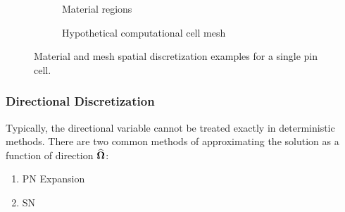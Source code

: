 {{{{                \begin{figure}[h]
                    \centering
                    \begin{subfigure}[t]{0.45\linewidth}
                        \centering
                        \def\svgwidth{\linewidth}
                        
                        \caption{Material regions}
                        \label{fig:NTT:Pin Cell Materials}
                    \end{subfigure}%
                    \hfill
                    \begin{subfigure}[t]{0.45\linewidth}
                        \centering
                        \def\svgwidth{\linewidth}
                        
                        \caption{Hypothetical computational cell mesh}
                        \label{fig:NTT:Pin Cell Mesh}
                    \end{subfigure}
                    \caption{Material and mesh spatial discretization examples for a single pin cell.}
                    \label{fig:NTT:Pin Cell}
                \end{figure}
            }
            \subsubsection{Directional Discretization}{\label{sssec:NTT:Directional Discretization}
                

                Typically, the directional variable cannot be treated exactly in deterministic methods.
                There are two common methods of approximating the solution as a function of direction $\boldsymbol{\widehat{\Omega}}$:
                \begin{enumerate}
                    \item{\acf{PN} Expansion}
                    \item{\acf{SN}}
                \end{enumerate}

}}}}
